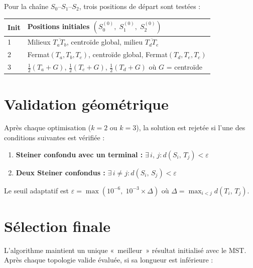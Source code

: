\documentclass[12pt, a4paper]{article}
\newcommand{\dist}[2]{d\!\left(#1,\,#2\right)}
\begin{document}
Pour la chaîne $S_0$–$S_1$–$S_2$, trois positions de départ sont testées :

\begin{center}
\begin{tabular}{ll}
\toprule
\textbf{Init} & \textbf{Positions initiales $(S_0^{(0)},\; S_1^{(0)},\; S_2^{(0)})$} \\
\midrule
1 & Milieux $\overline{T_a T_b}$, centroïde global, milieu $\overline{T_d T_e}$ \\
2 & Fermat$(T_a, T_b, T_c)$, centroïde global, Fermat$(T_d, T_e, T_c)$ \\
3 & $\tfrac{1}{2}(T_a + G)$,\; $\tfrac{1}{2}(T_c + G)$,\; $\tfrac{1}{2}(T_d + G)$ où $G$ = centroïde \\
\bottomrule
\end{tabular}
\end{center}

\section{Validation géométrique}

Après chaque optimisation ($k = 2$ ou $k = 3$), la solution est rejetée si l'une
des conditions suivantes est vérifiée :

\begin{enumerate}
    \item \textbf{Steiner confondu avec un terminal :}
          $\exists\, i,\, j : \dist{S_i}{T_j} < \varepsilon$
    \item \textbf{Deux Steiner confondus :}
          $\exists\, i \neq j : \dist{S_i}{S_j} < \varepsilon$
\end{enumerate}

Le seuil adaptatif est $\varepsilon = \max(10^{-6},\; 10^{-3} \times \Delta)$
où $\Delta = \max_{i < j}\dist{T_i}{T_j}$.

\section{Sélection finale}

L'algorithme maintient un unique «~meilleur~» résultat initialisé avec le MST.
Après chaque topologie valide évaluée, si sa longueur est inférieure :
\end{document}
